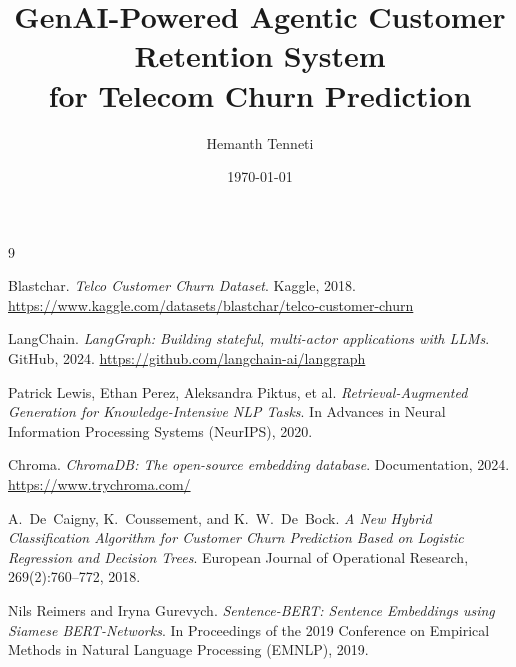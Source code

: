 \documentclass[12pt,a4paper]{article}
\title{\textbf{GenAI-Powered Agentic Customer Retention System\\for Telecom Churn Prediction}}
\author{Hemanth Tenneti}
\date{\today}
\begin{document}
\maketitle








\begin{thebibliography}{9}

Blastchar.
\textit{Telco Customer Churn Dataset}.
Kaggle, 2018.
\url{https://www.kaggle.com/datasets/blastchar/telco-customer-churn}

LangChain.
\textit{LangGraph: Building stateful, multi-actor applications with LLMs}.
GitHub, 2024.
\url{https://github.com/langchain-ai/langgraph}

Patrick Lewis, Ethan Perez, Aleksandra Piktus, et al.
\textit{Retrieval-Augmented Generation for Knowledge-Intensive NLP Tasks}.
In Advances in Neural Information Processing Systems (NeurIPS), 2020.

Chroma.
\textit{ChromaDB: The open-source embedding database}.
Documentation, 2024.
\url{https://www.trychroma.com/}

A.~De~Caigny, K.~Coussement, and K.~W.~De~Bock.
\textit{A New Hybrid Classification Algorithm for Customer Churn Prediction Based on Logistic Regression and Decision Trees}.
European Journal of Operational Research, 269(2):760--772, 2018.

Nils Reimers and Iryna Gurevych.
\textit{Sentence-BERT: Sentence Embeddings using Siamese BERT-Networks}.
In Proceedings of the 2019 Conference on Empirical Methods in Natural Language Processing (EMNLP), 2019.

\end{thebibliography}
\end{document}

